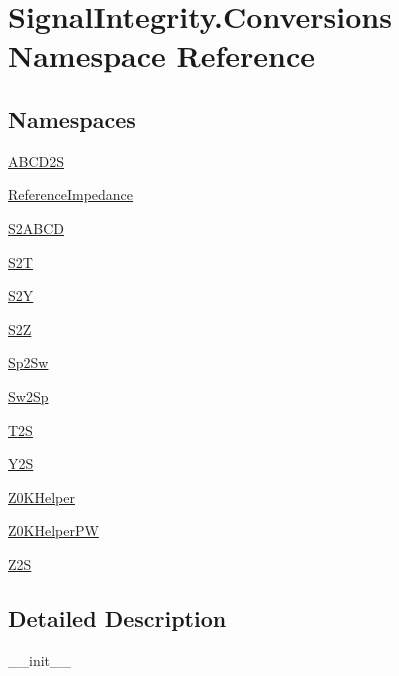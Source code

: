 \hypertarget{namespaceSignalIntegrity_1_1Conversions}{}\section{Signal\+Integrity.\+Conversions Namespace Reference}
\label{namespaceSignalIntegrity_1_1Conversions}
\subsection*{Namespaces}
\begin{DoxyCompactItemize}
\item 
 \hyperlink{namespaceSignalIntegrity_1_1Conversions_1_1ABCD2S}{A\+B\+C\+D2S}
\item 
 \hyperlink{namespaceSignalIntegrity_1_1Conversions_1_1ReferenceImpedance}{Reference\+Impedance}
\item 
 \hyperlink{namespaceSignalIntegrity_1_1Conversions_1_1S2ABCD}{S2\+A\+B\+CD}
\item 
 \hyperlink{namespaceSignalIntegrity_1_1Conversions_1_1S2T}{S2T}
\item 
 \hyperlink{namespaceSignalIntegrity_1_1Conversions_1_1S2Y}{S2Y}
\item 
 \hyperlink{namespaceSignalIntegrity_1_1Conversions_1_1S2Z}{S2Z}
\item 
 \hyperlink{namespaceSignalIntegrity_1_1Conversions_1_1Sp2Sw}{Sp2\+Sw}
\item 
 \hyperlink{namespaceSignalIntegrity_1_1Conversions_1_1Sw2Sp}{Sw2\+Sp}
\item 
 \hyperlink{namespaceSignalIntegrity_1_1Conversions_1_1T2S}{T2S}
\item 
 \hyperlink{namespaceSignalIntegrity_1_1Conversions_1_1Y2S}{Y2S}
\item 
 \hyperlink{namespaceSignalIntegrity_1_1Conversions_1_1Z0KHelper}{Z0\+K\+Helper}
\item 
 \hyperlink{namespaceSignalIntegrity_1_1Conversions_1_1Z0KHelperPW}{Z0\+K\+Helper\+PW}
\item 
 \hyperlink{namespaceSignalIntegrity_1_1Conversions_1_1Z2S}{Z2S}
\end{DoxyCompactItemize}


\subsection{Detailed Description}
\begin{DoxyVerb}__init__\end{DoxyVerb}
 